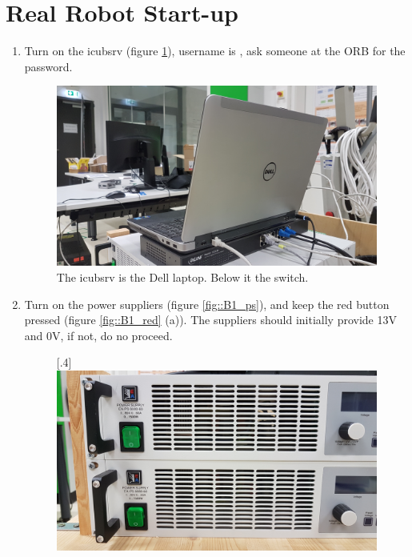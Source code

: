 \section{Real Robot Start-up}
\label{sec::B1_rr}
\begin{enumerate}
	\item Turn on the icubsrv (figure \ref{fig::B1_icubsrv}), username is , ask someone at the ORB for the password.%
	\begin{figure}[h!]
		\centering
		\includegraphics[scale=.04]{chapters/06_appendix/img/icubsrv.jpg}
		\caption{The icubsrv is the Dell laptop. Below it the switch.}
		\label{fig::B1_icubsrv}
	\end{figure}
	\item Turn on the power suppliers (figure \ref{fig::B1_ps}), and keep the red button pressed (figure \ref{fig::B1_red} (a)). The suppliers should initially provide 13V and 0V, if not, do no proceed.
	\begin{figure}[h!]
		\centering
		[.4\linewidth]{\includegraphics[scale=.04]{chapters/06_appendix/img/power_supply.jpg}}

\end{figure}
\end{enumerate}
